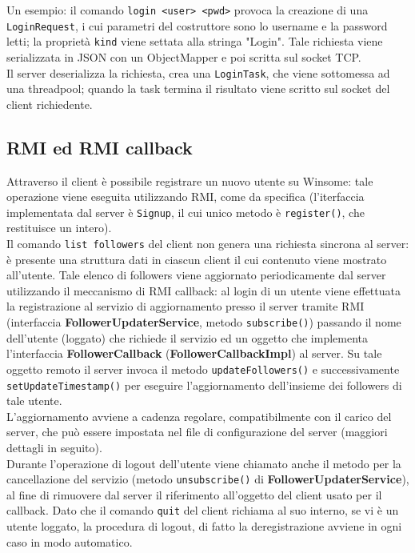 Un esempio: il comando \verb|login <user> <pwd>| provoca la creazione di una \verb|LoginRequest|,
i cui parametri del costruttore sono lo username e la password letti; la proprietà \verb|kind| viene settata alla stringa "Login".
Tale richiesta viene serializzata in JSON con un ObjectMapper e poi scritta sul socket TCP.\\
Il server deserializza la richiesta, crea una \verb|LoginTask|, che viene sottomessa ad una threadpool; quando la
task termina il risultato viene scritto sul socket del client richiedente.

 \subsection{RMI ed RMI callback}
Attraverso il client è possibile registrare un nuovo utente su Winsome: tale operazione 
viene eseguita utilizzando RMI, come da specifica (l'iterfaccia implementata dal server è \verb|Signup|, 
il cui unico metodo è \verb|register()|, che restituisce un intero).\\

 Il comando \verb|list followers| del client non genera una richiesta sincrona al server: 
 è presente una struttura dati in ciascun client il cui contenuto viene mostrato all'utente. 
 Tale elenco di followers viene aggiornato periodicamente dal server utilizzando il meccanismo 
 di RMI callback: al login di un utente viene effettuata la registrazione al servizio di aggiornamento presso il server 
 tramite RMI (interfaccia \textbf{FollowerUpdaterService}, metodo \verb|subscribe()|) passando il nome dell'utente 
 (loggato) che richiede il servizio ed un oggetto che implementa l'interfaccia \textbf{FollowerCallback} 
 (\textbf{FollowerCallbackImpl}) al server. Su tale oggetto remoto il server invoca il metodo 
 \verb|updateFollowers()| e successivamente \verb|setUpdateTimestamp()| per eseguire 
 l'aggiornamento dell'insieme dei followers di tale utente.\\
 L'aggiornamento avviene a cadenza regolare, compatibilmente con il carico del server, che può essere
 impostata nel file di configurazione del server (maggiori dettagli in seguito).\\
 Durante l'operazione di logout dell'utente viene chiamato anche il metodo per la cancellazione
 del servizio (metodo \verb|unsubscribe()| di \textbf{FollowerUpdaterService}), al fine di rimuovere
 dal server il riferimento all'oggetto del client usato per il callback. Dato che il comando
 \verb|quit| del client richiama al suo interno, se vi è un utente loggato, la procedura di logout,
 di fatto la deregistrazione avviene in ogni caso in modo automatico.

